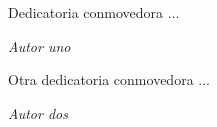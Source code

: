 Dedicatoria conmovedora ...\\
\begin{flushright}
\textit{Autor uno}
\end{flushright}
\vspace{\baselineskip}
\indent Otra dedicatoria conmovedora ...\\
\begin{flushright}
\textit{Autor dos}
\end{flushright}
\newpage
